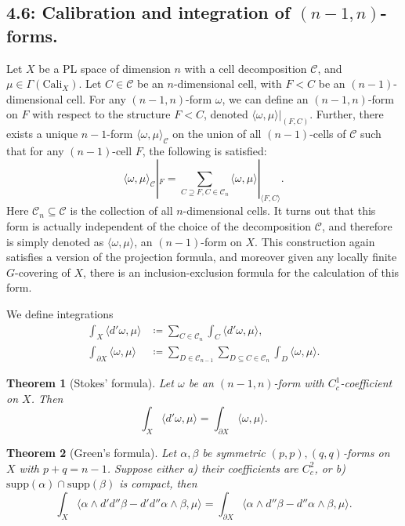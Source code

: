\documentclass[12pt,reqno]{amsart}
\newtheorem{theorem}{Theorem}[section]
\theoremstyle{definition}
\theoremstyle{remark}
\theoremstyle{citedrem}
\theoremstyle{cited}
\theoremstyle{citeddef}
\theoremstyle{step}
\begin{document}
\subsection*{4.6: Calibration and integration of $(n-1,n)$-forms.}
Let $X$ be a PL space of dimension $n$ with a cell decomposition $\mathcal{C}$, and $\mu \in \Gamma(\mathrm{Cali}_X)$. Let $C \in \mathcal{C}$ be an $n$-dimensional cell, with $F < C$ be an $(n-1)$-dimensional cell. For any $(n-1,n)$-form $\omega$, we can define an $(n-1,n)$-form on $F$ with respect to the structure $F < C$, denoted $\langle \omega, \mu \rangle |_{(F,C)}$. Further, there exists a unique $n-1$-form $\langle \omega, \mu\rangle_{\mathcal{C}}$ on the union of all $(n-1)$-cells of $\mathcal{C}$ such that for any $(n-1)$-cell $F$, the following is satisfied: 
\[\langle \omega, \mu \rangle_{\mathcal{C}} |_F = \sum_{C \supseteq F, C \in \mathcal{C}_n} \langle \omega, \mu \rangle|_{\langle F, C \rangle}.\]
Here $\mathcal{C}_n \subseteq \mathcal{C}$ is the collection of all $n$-dimensional cells. It turns out that this form is actually independent of the choice of the decomposition $\mathcal{C}$, and therefore is simply denoted as $\langle \omega, \mu \rangle$, an $(n-1)$-form on $X$. This construction again satisfies a version of the projection formula, and moreover given any locally finite $G$-covering of $X$, there is an inclusion-exclusion formula for the calculation of this form. 

We define integrations
\begin{align*}
    \int_X \langle d'\omega, \mu \rangle &\coloneqq \sum_{C \in \mathcal{C}_n} \int_C \langle d' \omega, \mu\rangle,\\
    \int_{\partial X} \langle \omega, \mu \rangle &\coloneqq \sum_{D \in \mathcal{C}_{n-1}} \sum_{D\subseteq C \in \mathcal{C}_n} \int_D \langle \omega, \mu \rangle.
\end{align*}

\begin{theorem}[Stokes' formula]
    Let $\omega$ be an $(n-1,n)$-form with $C^1_c$-coefficient on $X$. Then \[\int_X \langle d'\omega, \mu \rangle = \int_{\partial X} \langle \omega, \mu \rangle.\]
\end{theorem}

\begin{theorem}[Green's formula]
    Let $\alpha, \beta$ be symmetric $(p,p), (q,q)$-forms on $X$ with $p+q = n-1$. Suppose either a) their coefficients are $C^2_c$, or b) $\mathrm{supp}(\alpha) \cap \mathrm{supp}(\beta)$ is compact, then 
    \[\int_X \langle \alpha \wedge d'd''\beta - d'd''\alpha \wedge \beta, \mu \rangle = \int_{\partial X} \langle \alpha \wedge d'' \beta - d'' \alpha \wedge \beta, \mu \rangle. \]
\end{theorem}
\end{document}
